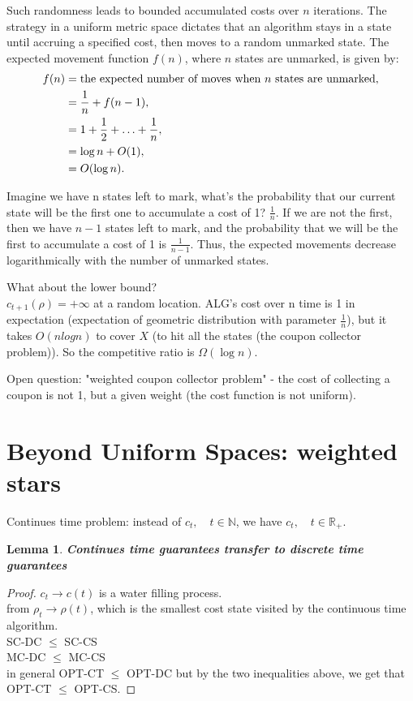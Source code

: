 \documentclass[11pt]{book} %
\newtheorem{lemma}{Lemma}[section]
\begin{document}
Such randomness leads to bounded accumulated costs over \( n \) iterations. 
The strategy in a uniform metric space dictates that an algorithm stays in a state until accruing a specified cost, 
then moves to a random unmarked state. The expected movement function \( f(n) \), where \( n \) states are unmarked, is given by:
\begin{align*}
f(n) &= \text{the expected number of moves when \( n \) states are unmarked}, \\
&= \frac{1}{n} + f(n-1), \\
&= 1 + \frac{1}{2} + \ldots + \frac{1}{n}, \\
&= \log n + O(1), \\
&= O(\log n).
\end{align*}

Imagine we have n states left to mark, what's the probability that our current state will be the first one to accumulate a cost of 1? $\frac{1}{n}$.
If we are not the first, then we have $n-1$ states left to mark, and the probability that we will be the first to accumulate a cost of 1 is $\frac{1}{n-1}$.
Thus, the expected movements decrease logarithmically with the number of unmarked states. 

What about the lower bound? \\
$c_{t+1}(\rho) = +\infty$ at a random location.
ALG's cost over n time is 1 in expectation (expectation of geometric distribution with parameter $\frac{1}{n}$), 
but it takes $O(n log n)$ to cover $X$ (to hit all the states (the coupon collector problem)).
So the competitive ratio is $\Omega(\log n)$.

\bigbreak

Open question: "weighted coupon collector problem" - the cost of collecting a coupon is not 1, but a given weight (the cost function is not uniform).


\section{Beyond Uniform Spaces: weighted stars} 

Continues time problem: instead of $c_t, \quad t \in \mathbb{N}$, we have $c_t,\quad t \in \mathbb{R}_+$. 

\begin{lemma}{\textbf{Continues time guarantees transfer to discrete time guarantees}} \end{lemma}

\begin{proof}
    $c_t \to c(t)$ is a water filling process. \\
    from $\rho_t \to \rho(t)$, which is the smallest cost state visited by the continuous time algorithm. \\
    SC-DC $\leq$ SC-CS \\
    MC-DC $\leq$ MC-CS \\
    in general OPT-CT $\leq$ OPT-DC but by the two inequalities above, we get that OPT-CT $\leq$ OPT-CS.
\end{proof}
\end{document}
